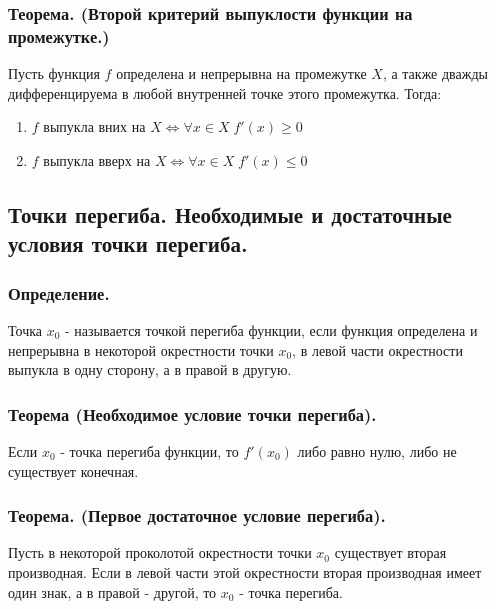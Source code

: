 \documentclass[a4paper,12pt]{article}
\theoremstyle{plain} %
\theoremstyle{definition} %
\theoremstyle{remark} %
\begin{document}
\subsubsection*{Теорема. (Второй критерий выпуклости функции на промежутке.)}
Пусть функция $f$ определена и непрерывна на промежутке $X$, а также дважды дифференцируема в любой внутренней точке этого промежутка.
Тогда:

\begin{enumerate}
	\item $f$ выпукла вних на $X \Leftrightarrow \forall x \in X \;  f'(x) \geq 0$
	\item $f$ выпукла вверх на $X \Leftrightarrow \forall x \in X \; f'(x) \leq 0$
\end{enumerate}








\newpage
\subsection*{Точки перегиба. Необходимые и достаточные условия точки перегиба.                                        }

\subsubsection*{Определение.}
Точка $x_0$ - называется точкой перегиба функции, если функция определена и непрерывна в некоторой окрестности точки $x_0$, в левой части окрестности выпукла в одну сторону, а в правой в другую.

\subsubsection*{Теорема (Необходимое условие точки перегиба).}
Если $x_0$ - точка перегиба функции, то $f'(x_0)$ либо равно нулю, либо не существует конечная.

\subsubsection*{Теорема. (Первое достаточное условие перегиба).}
Пусть в некоторой проколотой окрестности точки $x_0$ существует вторая производная. Если в левой части этой окрестности вторая производная имеет один знак, а в правой - другой, то $x_0$ - точка перегиба.
\end{document}
